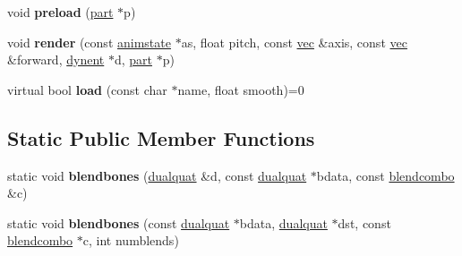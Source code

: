 \begin{DoxyCompactItemize}
\item 
\mbox{\label{structskelmodel_1_1skelmeshgroup_abab073769d58f918cfe31376fac85d9a}} 
void {\bfseries preload} (\hyperlink{structanimmodel_1_1part}{part} $\ast$p)
\item 
\mbox{\label{structskelmodel_1_1skelmeshgroup_aceafd660fa38f8ec381f77d0296aa587}} 
void {\bfseries render} (const \hyperlink{structanimmodel_1_1animstate}{animstate} $\ast$as, float pitch, const \hyperlink{structvec}{vec} \&axis, const \hyperlink{structvec}{vec} \&forward, \hyperlink{structdynent}{dynent} $\ast$d, \hyperlink{structanimmodel_1_1part}{part} $\ast$p)
\item 
\mbox{\label{structskelmodel_1_1skelmeshgroup_a320ea2624a4a5770895a53b4fdef15af}} 
virtual bool {\bfseries load} (const char $\ast$name, float smooth)=0
\end{DoxyCompactItemize}
\subsection*{Static Public Member Functions}
\begin{DoxyCompactItemize}
\item 
\mbox{\label{structskelmodel_1_1skelmeshgroup_adb0439b90a91f5d67a575d8292ec688e}} 
static void {\bfseries blendbones} (\hyperlink{structdualquat}{dualquat} \&d, const \hyperlink{structdualquat}{dualquat} $\ast$bdata, const \hyperlink{structskelmodel_1_1blendcombo}{blendcombo} \&c)
\item 
\mbox{\label{structskelmodel_1_1skelmeshgroup_a54a4b7d3c483042c77e8dddb8dfc7568}} 
static void {\bfseries blendbones} (const \hyperlink{structdualquat}{dualquat} $\ast$bdata, \hyperlink{structdualquat}{dualquat} $\ast$dst, const \hyperlink{structskelmodel_1_1blendcombo}{blendcombo} $\ast$c, int numblends)
\end{DoxyCompactItemize}
